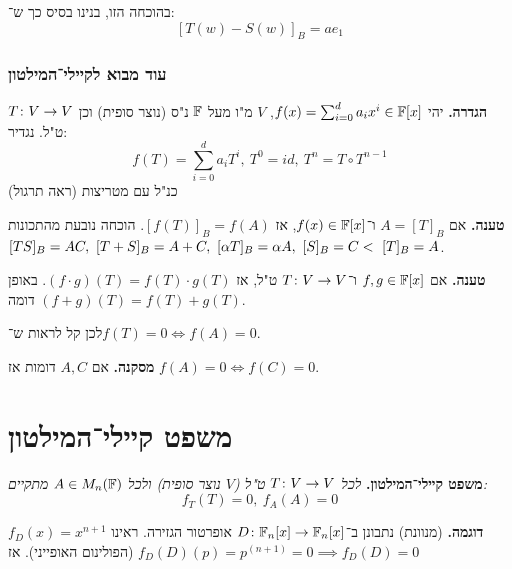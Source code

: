 \documentclass[]{../../../../tex/classes/styledArticle}
\begin{document}
	בהוכחה הזו, בנינו בסיס כך ש־: 
	\[ [T(w) - S(w)]_B = ae_1 \]
	
	\subsubsection{עוד מבוא לקיילי־המילטון}
	\textbf{הגדרה. }יהי $f(x) = \sum_{i = 0}^{d}a_ix^i \in \mathbb{F}[x]$, $V$ מ"ו מעל $\mathbb{F}$ נ"ס (נוצר סופית) וכן $T \colon V \to V$ ט"ל. נגדיר: 
	\[ f(T) = \sum_{i = 0}^{d}a_iT^{i}, \ T^0 = id, \ T^{n} = T \circ T^{n - 1} \]
	כנ"ל עם מטריצות (ראה תרגול)
	
	\textbf{טענה. }אם $A = [T]_B$ ו־$f(x) \in \mathbb{F}[x]$, אז $[f(T)]_B = f(A)$. הוכחה נובעת מהתכונות $[TS]_B = AC, \ [T + S]_B = A + C, \ [\alpha T]_B = \alpha A, \ [S]_B = C<\ [T]_B = A$. 
	
	\textbf{טענה. }אם $f, g \in \mathbb{F}[x]$ ו־$T \colon V \to V$ ט"ל, אז $(f \cdot g)(T) = f(T) \cdot g(T)$. באופן דומה $(f + g)(T) = f(T) + g(T)$. 
	
	לכן קל לראות ש־$f(T) = 0 \iff f(A) = 0$. 
	
	\textbf{מסקנה. }אם $A, C$ דומות אז $f(A) = 0 \iff f(C) = 0$. 
	
	\section{משפט קיילי־המילטון}
	\textbf{משפט קיילי־המילטון. }\textit{לכל $T\colon V \to V$ ט"ל ($V$ נוצר סופית) ולכל $A \in M_n(\mathbb{F})$ מתקיים: 
	\[ f_T(T) = 0, \ f_A(A) = 0 \]}
	
	\textbf{דוגמה. }(מנוונת) נתבונן ב־$D \colon \mathbb{F}_n[x] \to \mathbb{F}_n[x]$ אופרטור הגזירה. ראינו $f_D(x) = x^{n + 1}$ (הפולינום האופייני). אז $f_D(D)(p) = p^{(n + 1)} = 0 \implies f_D(D) = 0$
	
\end{document}
